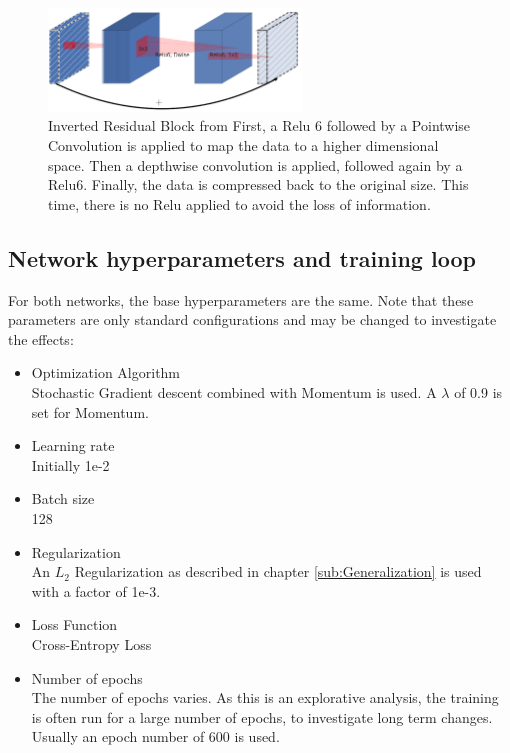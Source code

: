 \begin{figure}[h]\label{fig:InvRes}
    \centering
    \includegraphics[width=0.6\textwidth]{images/Inverted_Residual.png}
    \caption{Inverted Residual Block from \cite[Page 3]{sandler2018mobilenetv2}\newline 
    First, a Relu 6 followed by a Pointwise Convolution is applied to map the
     data to a higher dimensional space. Then a depthwise convolution is
     applied, followed again by a Relu6. Finally, the data is compressed back to
     the original size. This time, there is no Relu applied to avoid the loss of
     information.}
\end{figure}


\subsection{Network hyperparameters and training loop}\label{sub:Hyperparameters}
For both networks, the base hyperparameters are the same. Note that these
parameters are only standard configurations and may be changed to investigate
the effects:
\begin{itemize}
    \item Optimization Algorithm \\Stochastic Gradient descent combined with
    Momentum is used. A $\lambda$ of 0.9 is set for Momentum.
    \item Learning rate \\Initially 1e-2
    \item Batch size \\128
    \item Regularization \\An $L_2$ Regularization as described in chapter
    \ref{sub:Generalization} is used with a factor of 1e-3.
    \item Loss Function \\Cross-Entropy Loss
    \item Number of epochs \\The number of epochs varies. As this is an
    explorative analysis, the training is often run for a large number of
    epochs, to investigate long term changes. Usually an epoch number of 600 is
    used.
\end{itemize}


